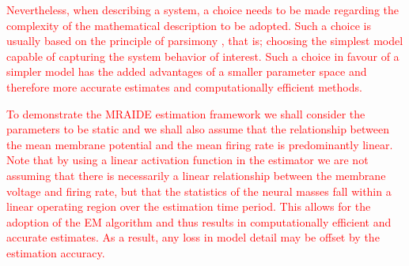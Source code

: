 \documentclass[review,authoryear,3p]{elsarticle}
\newcommand{\ken}[1]{\textcolor{red}{#1}}
\begin{document}


\ken{Nevertheless, when describing a system, a choice needs to be made regarding the complexity of the mathematical description to be adopted. Such a choice is usually based on the principle of parsimony \cite{Illfindit}, that is; choosing the simplest model capable of capturing the system behavior of interest. Such a choice in favour of a simpler model has the added advantages of a smaller parameter space and therefore more accurate estimates and computationally efficient methods.}

\ken{To demonstrate the MRAIDE estimation framework we shall consider the parameters to be static and we shall also assume that the relationship between the mean membrane potential and the mean firing rate is predominantly linear. Note that by using a linear activation function in the estimator we are not assuming that there is necessarily a linear relationship between the membrane voltage and firing rate, but that the statistics of the neural masses fall within a linear operating region over the estimation time period. This allows for the adoption of the EM algorithm and thus results in computationally efficient and accurate estimates. As a result, any loss in model detail may be offset by the estimation accuracy.}
\end{document}
